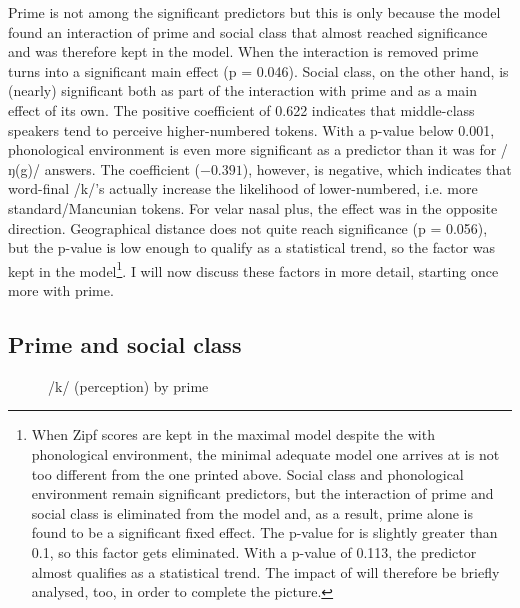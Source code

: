 Prime is not among the significant predictors but this is only because the model found an interaction of prime and social class that almost reached significance and was therefore kept in the model.
When the interaction is removed prime turns into a significant main effect (p = 0.046).
Social class, on the other hand, is (nearly) significant both as part of the interaction with prime and as a main effect of its own.
The positive coefficient of 0.622 indicates that middle-class speakers tend to perceive higher-numbered tokens.
With a p-value below 0.001, phonological environment is even more significant as a predictor than it was for /ŋ(g)/ answers.
The coefficient (\ensuremath{-0.391}), however, is negative, which indicates that word-final /k/'s actually increase the likelihood of lower-numbered, i.e. more standard/Mancunian tokens.
For velar nasal plus, the effect was in the opposite direction.
Geographical distance does not quite reach significance (p = 0.056), but the p-value is low enough to qualify as a statistical trend, so the factor was kept in the model\footnote{When Zipf scores are kept in the maximal model despite the  with phonological environment, the minimal adequate model one arrives at is not too different from the one printed above. Social class and phonological environment remain significant predictors, but the interaction of prime and social class is eliminated from the model and, as a result, prime alone is found to be a significant fixed effect. The p-value for  is slightly greater than 0.1, so this factor gets eliminated. With a p-value of 0.113, the predictor  almost qualifies as a statistical trend. The impact of  will therefore be briefly analysed, too, in order to complete the picture.}.
I will now discuss these factors in more detail, starting once more with prime.

\subsection{Prime and social class}
\label{sec.perc_res.k.prime}

\begin{figure}
	
		\resizebox{.49\linewidth}{!}{} 
	\caption{/k/ (perception) by prime}
	\label{fig.bar.k.tot.ext}
\end{figure}

